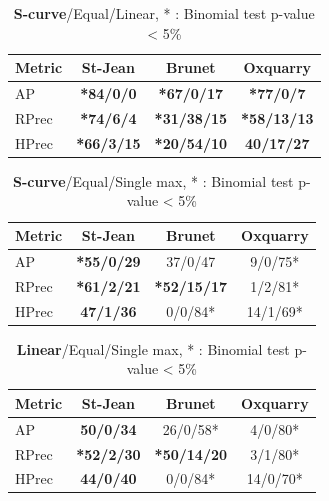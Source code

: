 \begin{table}[h]
  \caption{\textbf{S-curve}/Equal/Linear,  * : Binomial test p-value < 5\%}
  \centering
  \label{}
  \begin{tabular}{l c c c}
    \toprule
    Metric & St-Jean & Brunet & Oxquarry \\ \midrule
    AP     & \textbf{*84/0/0} & \textbf{*67/0/17} & \textbf{*77/0/7} \\
    RPrec  & \textbf{*74/6/4} & \textbf{*31/38/15} & \textbf{*58/13/13} \\
    HPrec  & \textbf{*66/3/15} & \textbf{*20/54/10} & \textbf{40/17/27} \\
    \bottomrule
  \end{tabular}
\end{table}

\begin{table}[h]
  \caption{\textbf{S-curve}/Equal/Single max,  * : Binomial test p-value < 5\%}
  \centering
  \label{}
  \begin{tabular}{l c c c}
    \toprule
    Metric & St-Jean  & Brunet & Oxquarry \\ \midrule
    AP     & \textbf{*55/0/29} & 37/0/47 & 9/0/75* \\
    RPrec  & \textbf{*61/2/21} & \textbf{*52/15/17} & 1/2/81* \\
    HPrec  & \textbf{47/1/36} & 0/0/84* & 14/1/69* \\
    \bottomrule
  \end{tabular}
\end{table}

\begin{table}[h]
  \caption{\textbf{Linear}/Equal/Single max,  * : Binomial test p-value < 5\%}
  \centering
  \label{}
  \begin{tabular}{l c c c}
    \toprule
    Metric& St-Jean  & Brunet & Oxquarry \\ \midrule
    AP    & \textbf{50/0/34} & 26/0/58* & 4/0/80* \\
    RPrec & \textbf{*52/2/30} & \textbf{*50/14/20} & 3/1/80* \\
    HPrec & \textbf{44/0/40} & 0/0/84* & 14/0/70* \\
    \bottomrule
  \end{tabular}
\end{table}

